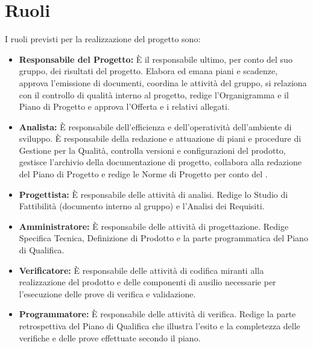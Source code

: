 \section{Ruoli}

I ruoli previsti per la realizzazione del progetto sono:

\begin{itemize}
	\item \textbf{Responsabile del Progetto:} È il responsabile ultimo, per conto del suo gruppo, dei risultati del progetto.
Elabora ed emana piani e scadenze, approva l'emissione di documenti, coordina le attività del gruppo, si relaziona con il controllo di qualità interno al progetto, redige l'Organigramma e il Piano di Progetto e approva l'Offerta e i relativi allegati.
	\item \textbf{Analista:} È responsabile dell'efficienza e dell'operatività dell'ambiente di sviluppo. 
È responsabile della redazione e attuazione di piani e procedure di Gestione per la Qualità, controlla versioni e configurazioni del prodotto, gestisce l'archivio della documentazione di progetto, collabora alla redazione del Piano di Progetto e redige le Norme di Progetto per conto del \ruoloResponsabile.
	\item \textbf{Progettista:} È responsabile delle attività di analisi. 
Redige lo Studio di Fattibilità (documento interno al gruppo) e l'Analisi dei Requisiti.
	\item \textbf{Amministratore:} È responsabile delle attività di progettazione. 
Redige Specifica Tecnica, Definizione di Prodotto e la parte programmatica del Piano di Qualifica.
	\item \textbf{Verificatore:} È responsabile delle attività di codifica miranti alla realizzazione del prodotto e delle componenti di ausilio necessarie per l'esecuzione delle prove di verifica e validazione.
	\item \textbf{Programmatore:} È responsabile delle attività di verifica.
Redige la parte retrospettiva del Piano di Qualifica che illustra l'esito e la completezza delle verifiche e delle prove effettuate secondo il piano.
\end{itemize}

